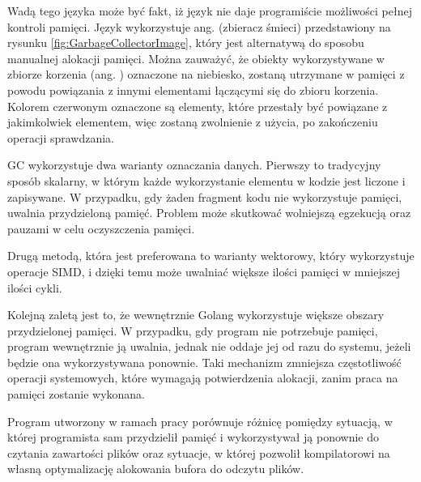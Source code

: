 Wadą tego języka może być fakt, iż język nie daje programiście możliwości pełnej
kontroli pamięci. Język wykorzystuje ang.  (zbieracz 
śmieci) przedstawiony na rysunku \ref{fig:GarbageCollectorImage}, który jest 
alternatywą do sposobu manualnej alokacji pamięci. Można zauważyć, że obiekty
wykorzystywane w zbiorze korzenia (ang. ) oznaczone na 
niebiesko, zostaną utrzymane w pamięci z powodu powiązania z innymi elementami
łączącymi się do zbioru korzenia. Kolorem czerwonym oznaczone są elementy, które
przestały być powiązane z jakimkolwiek elementem, więc zostaną zwolnienie z 
użycia, po zakończeniu operacji sprawdzania. 

GC wykorzystuje dwa warianty oznaczania danych. Pierwszy to tradycyjny sposób
skalarny, w którym każde wykorzystanie elementu w kodzie jest liczone i
zapisywane. W przypadku, gdy żaden fragment kodu nie wykorzystuje pamięci,
uwalnia przydzieloną pamięć. Problem może skutkować wolniejszą egzekucją oraz
pauzami w celu oczyszczenia pamięci.

Drugą metodą, która jest preferowana to warianty wektorowy, który wykorzystuje 
operacje SIMD, i dzięki temu może uwalniać większe ilości pamięci w  mniejszej
ilości cykli. 

Kolejną zaletą jest to, że wewnętrznie Golang wykorzystuje większe obszary
przydzielonej pamięci. W przypadku, gdy program nie potrzebuje pamięci, program
wewnętrznie ją uwalnia, jednak nie oddaje jej od razu do systemu, jeżeli będzie 
ona wykorzystywana ponownie. Taki mechanizm zmniejsza częstotliwość operacji
systemowych, które wymagają potwierdzenia alokacji, zanim praca na pamięci 
zostanie wykonana. 

Program utworzony w ramach pracy porównuje różnicę pomiędzy sytuacją, w której
programista sam przydzielił pamięć i wykorzystywał ją ponownie do czytania 
zawartości plików oraz sytuacje, w której pozwolił kompilatorowi na własną
optymalizację alokowania bufora do odczytu plików.




